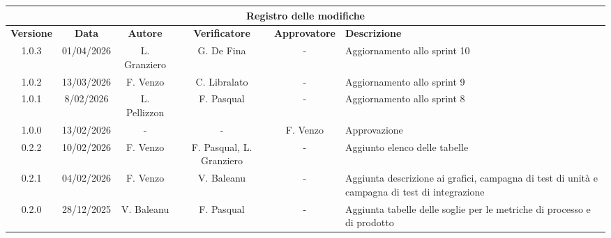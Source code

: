 \documentclass[10pt, letterpaper]{article}
\begin{document}
\begin{center}
    \begin{tabularx}{\textwidth}{|c|c|c|c|c|X|}
        \hline
        \multicolumn{6}{|c|}{\textbf{Registro delle modifiche}}                                                                                                                                                                    \\
        \hline
        \rowcolor{lightgray} \textbf{Versione} & \textbf{Data} & \textbf{Autore} & \textbf{Verificatore}    & \textbf{Approvatore} & \textbf{Descrizione}                                                                          \\
        \hline 1.0.3                           & 01/04/2026    & L. Granziero    & G. De Fina               & -                    & Aggiornamento allo sprint 10                                                                  \\
        \hline
        1.0.2                                  & 13/03/2026    & F. Venzo        & C. Libralato             & -                    & Aggiornamento allo sprint 9                                                                   \\
        \hline
        1.0.1                                  & 8/02/2026     & L. Pellizzon    & F. Pasqual               & -                    & Aggiornamento allo sprint 8                                                                   \\
        \hline
        1.0.0                                  & 13/02/2026    & -               & -                        & F. Venzo             & Approvazione                                                                                  \\
        \hline
        0.2.2                                  & 10/02/2026    & F. Venzo        & F. Pasqual, L. Granziero & -                    & Aggiunto elenco delle tabelle                                                                 \\
        \hline
        0.2.1                                  & 04/02/2026    & F. Venzo        & V. Baleanu               & -                    & Aggiunta descrizione ai grafici, campagna di test di unità e campagna di test di integrazione \\
        \hline
        0.2.0                                  & 28/12/2025    & V. Baleanu      & F. Pasqual               & -                    & Aggiunta tabelle delle soglie per le metriche di processo e di prodotto                       \\

\end{tabularx}
\end{center}
\end{document}
